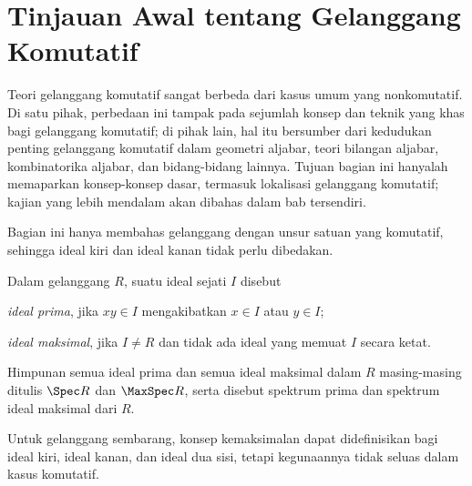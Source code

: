 \section{Tinjauan Awal tentang Gelanggang Komutatif}\label{sec:comm-ring-intro}
Teori gelanggang komutatif sangat berbeda dari kasus umum yang nonkomutatif. Di satu pihak, perbedaan ini tampak pada sejumlah konsep dan teknik yang khas bagi gelanggang komutatif; di pihak lain, hal itu bersumber dari kedudukan penting gelanggang komutatif dalam geometri aljabar, teori bilangan aljabar, kombinatorika aljabar, dan bidang-bidang lainnya. Tujuan bagian ini hanyalah memaparkan konsep-konsep dasar, termasuk lokalisasi gelanggang komutatif; kajian yang lebih mendalam akan dibahas dalam bab tersendiri.

Bagian ini hanya membahas gelanggang dengan unsur satuan yang komutatif, sehingga ideal kiri dan ideal kanan tidak perlu dibedakan.

\begin{definition}\label{def:ring-ideal}
	Dalam gelanggang $R$, suatu ideal sejati $I$ disebut
	\begin{compactitem}
		\item \emph{ideal prima}, jika $xy \in I$ mengakibatkan $x \in I$ atau $y \in I$;
		\item \emph{ideal maksimal}, jika $I \neq R$ dan tidak ada ideal yang memuat $I$ secara ketat.
	\end{compactitem}
	Himpunan semua ideal prima dan semua ideal maksimal dalam $R$ masing-masing ditulis $\Spec R$ dan $\MaxSpec R$, serta disebut spektrum prima dan spektrum ideal maksimal dari $R$. 
\end{definition}
Untuk gelanggang sembarang, konsep kemaksimalan dapat didefinisikan bagi ideal kiri, ideal kanan, dan ideal dua sisi, tetapi kegunaannya tidak seluas dalam kasus komutatif.

